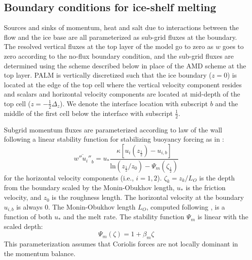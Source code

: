 \documentclass[tc, manuscript]{copernicus}
\begin{document}
\subsection{Boundary conditions for ice-shelf melting}\label{meth:tcm}

Sources and sinks of momentum, heat and salt due to interactions between the flow and the ice base are all parameterized as sub-grid fluxes at the boundary. The resolved vertical fluxes at the top layer of the model go to zero as $w$ goes to zero according to the no-flux boundary condition, and the sub-grid fluxes are determined using the scheme described below in place of the AMD scheme at the top layer. PALM is vertically discretized such that the ice boundary ($z=0$) is located at the edge of the top cell where the vertical velocity component resides and scalars and horizontal velocity components are located at mid-depth of the top cell ($z=-\frac{1}{2}\Delta_z$). We denote the interface location with subscript $b$ and the middle of the first cell below the interface with subscript $\frac{1}{2}$.

Subgrid momentum fluxes are parameterized according to law of the wall following a linear stability function for stabilizing buoyancy forcing as in \citet{vreugdenhil_stratification_2019}:
%
\begin{equation} \label{eq:tau}
    \overline{w''u_i''}_b = u_* \frac{ \kappa \left[u_i\left(z_{\frac{1}{2}}\right) - u_{i,b} \right]}{\textrm{ln}\left(z_{\frac{1}{2}}/z_0\right)-\Psi_m\left(\zeta_{\frac{1}{2}}\right)}
\end{equation}
%
for the horizontal velocity components (i.e., $i=1,2$). $\zeta_k = z_k/L_O$ is the depth from the boundary scaled by the Monin-Obukhov length, $u_*$ is the friction velocity, and $z_0$ is the roughness length. The horizontal velocity at the boundary $u_{i,b}$ is always 0. The Monin-Obukhov length $L_O$, computed following \citet{mcphee_dynamics_1987}, is a function of both $u_*$ and the melt rate. The stability function $\Psi_m$ is linear with the scaled depth:
\begin{equation}\label{eq:psi}
    \Psi_m(\zeta) = 1 + \beta_m \zeta
\end{equation}
This parameterization assumes that Coriolis forces are not locally dominant in the momentum balance.
\end{document}
